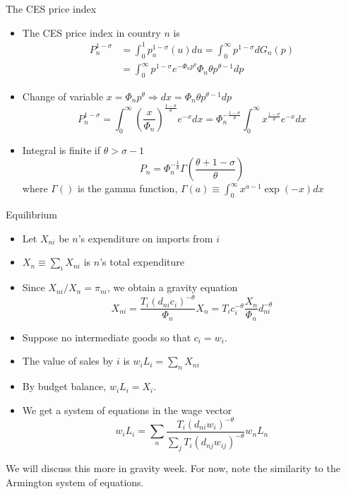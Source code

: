 \documentclass[11pt,notes=hide,aspectratio=169]{beamer}
\begin{document}
\begin{frame}{The CES price index}
\begin{itemize}
\item The CES price index in country $n$ is 
\begin{align*}
P_{n}^{1-\sigma } 
&=\int_{0}^{1}p_{n}^{1-\sigma }(u) du 
=\int_{0}^{\infty }p^{1-\sigma }dG_{n}\left( p\right) \\
&=\int_{0}^{\infty }p^{1-\sigma }e^{-\Phi _{n}p^{\theta }}\Phi _{n}\theta
p^{\theta -1}dp
\end{align*}
\item Change of variable $x=\Phi _{n}p^{\theta }\Rightarrow
dx=\Phi _{n}\theta p^{\theta -1}dp$
\begin{equation*}
P_{n}^{1-\sigma }
=\int_{0}^{\infty }\left( \frac{x}{\Phi _{n}}\right) ^{\frac{1-\sigma }{\theta }}e^{-x}dx
=\Phi _{n}^{-\frac{1-\sigma }{\theta }}\int_{0}^{\infty }x^{\frac{1-\sigma 
}{\theta }}e^{-x}dx
\end{equation*}
\item Integral is finite if $\theta>\sigma-1$
\begin{equation*}
P_{n} = \Phi _{n}^{-\frac{1}{\theta }} \Gamma \left( \frac{\theta +1-\sigma }{\theta }\right)
\end{equation*}
where $\Gamma()$ is the gamma function, $\Gamma(a)\equiv \int_{0}^{\infty} x^{a-1} \exp(-x)dx$
\end{itemize}
\end{frame}
\begin{frame}{Equilibrium}
\begin{itemize}
	\item Let $X_{ni}$ be $n$'s expenditure on imports from $i$
	\item $X_n \equiv \sum_{i} X_{ni}$ is $n$'s total expenditure
	\item Since $X_{ni} / X_n = \pi_{ni}$, we obtain a gravity equation
	\begin{equation*} 
	X_{ni} 
	= \frac{T_{i}\left( d _{ni}c_{i}\right) ^{-\theta}}{\Phi_n} X_n 
	= T_{i}c_{i}^{-\theta} \frac{X_n}{\Phi_n} d_{ni}^{-\theta} 
	\end{equation*}
	\item Suppose no intermediate goods so that $c_i = w_i$.
	\item The value of sales by $i$ is $w_i L_i = \sum_{n} X_{ni}$
	\item By budget balance, $w_i L_i = X_i$.
	\item We get a system of equations in the wage vector
		\begin{equation*}w_i L_i = \sum_n \frac{T_{i}\left( d _{ni}w_{i}\right) ^{-\theta}}{\sum _j T_{i}\left( d _{nj}w_{ij}\right) ^{-\theta}} w_n L_n
		\end{equation*}
\end{itemize}
We will discuss this more in gravity week. For now, note the similarity to the Armington system of equations.
\end{frame}
\end{document}

